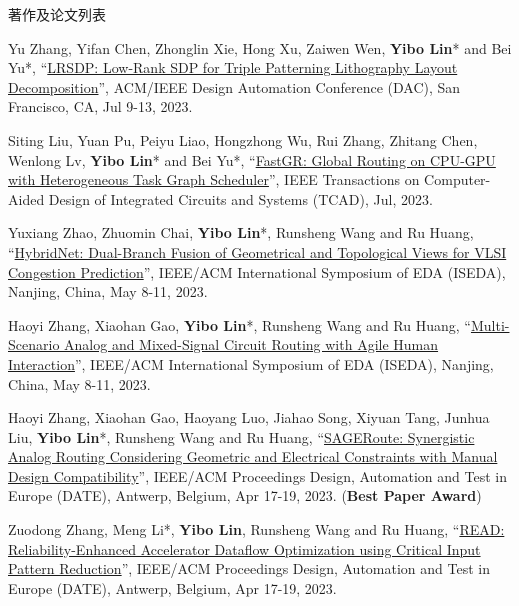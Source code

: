 \begin{rSection}{著作及论文列表}
\begin{description}[font=\normalfont, rightmargin=2em]
{}
            

\item[{[C117]}]{
        Yu Zhang, Yifan Chen, Zhonglin Xie, Hong Xu, Zaiwen Wen, \textbf{Yibo Lin}* and Bei Yu*, 
    ``\href{https://doi.org/10.1109/DAC56929.2023.10247846}{LRSDP: Low-Rank SDP for Triple Patterning Lithography Layout Decomposition}'', 
    ACM/IEEE Design Automation Conference (DAC), San Francisco, CA, Jul 9-13, 2023.
    
}
            

\item[{[J116]}]{
        Siting Liu, Yuan Pu, Peiyu Liao, Hongzhong Wu, Rui Zhang, Zhitang Chen, Wenlong Lv, \textbf{Yibo Lin}* and Bei Yu*, 
    ``\href{https://doi.org/10.1109/TCAD.2022.3217668}{FastGR: Global Routing on CPU-GPU with Heterogeneous Task Graph Scheduler}'', 
    IEEE Transactions on Computer-Aided Design of Integrated Circuits and Systems (TCAD), Jul, 2023.
    
}
            

\item[{[C115]}]{
        Yuxiang Zhao, Zhuomin Chai, \textbf{Yibo Lin}*, Runsheng Wang and Ru Huang, 
    ``\href{https://doi.org/10.1109/ISEDA59274.2023.10218656}{HybridNet: Dual-Branch Fusion of Geometrical and Topological Views for VLSI Congestion Prediction}'', 
    IEEE/ACM International Symposium of EDA (ISEDA), Nanjing, China, May 8-11, 2023.
    
}
            

\item[{[C114]}]{
        Haoyi Zhang, Xiaohan Gao, \textbf{Yibo Lin}*, Runsheng Wang and Ru Huang, 
    ``\href{https://doi.org/10.1109/ISEDA59274.2023.10218434}{Multi-Scenario Analog and Mixed-Signal Circuit Routing with Agile Human Interaction}'', 
    IEEE/ACM International Symposium of EDA (ISEDA), Nanjing, China, May 8-11, 2023.
    
}
            

\item[{[C113]}]{
        Haoyi Zhang, Xiaohan Gao, Haoyang Luo, Jiahao Song, Xiyuan Tang, Junhua Liu, \textbf{Yibo Lin}*, Runsheng Wang and Ru Huang, 
    ``\href{https://doi.org/10.23919/DATE56975.2023.10137296}{SAGERoute: Synergistic Analog Routing Considering Geometric and Electrical Constraints with Manual Design Compatibility}'', 
    IEEE/ACM Proceedings Design, Automation and Test in Europe (DATE), Antwerp, Belgium, Apr 17-19, 2023.
    (\textbf{Best Paper Award})
}
            

\item[{[C112]}]{
        Zuodong Zhang, Meng Li*, \textbf{Yibo Lin}, Runsheng Wang and Ru Huang, 
    ``\href{https://doi.org/10.23919/DATE56975.2023.10137254}{READ: Reliability-Enhanced Accelerator Dataflow Optimization using Critical Input Pattern Reduction}'', 
    IEEE/ACM Proceedings Design, Automation and Test in Europe (DATE), Antwerp, Belgium, Apr 17-19, 2023.
    
}
\end{description}
\end{rSection}
